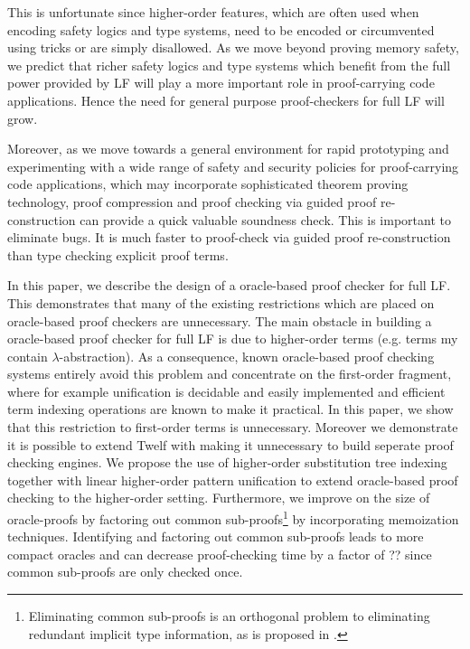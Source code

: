\documentclass{acmconf}
\begin{document}
This is
unfortunate since higher-order features, which are often used when
encoding safety logics and type systems, need to be encoded or
circumvented using tricks or are simply disallowed. As we move beyond
proving memory safety, we predict that richer safety logics and type
systems which benefit from the full power provided by LF will play a
more important role in proof-carrying code applications. Hence the
need for general purpose proof-checkers for full LF will grow.

Moreover, as we move towards a general environment for rapid
prototyping and experimenting with a wide range of safety and security
policies for proof-carrying code applications, which may incorporate
sophisticated theorem proving technology, proof compression and proof
checking via guided proof re-construction can provide a quick valuable
soundness check. This is important to eliminate bugs. It is much faster to
proof-check via guided proof re-construction than type checking
explicit proof terms.  

In this paper, we describe the design of a oracle-based proof checker for
full LF. This demonstrates that many of the existing restrictions
which are placed on oracle-based proof checkers are unnecessary. The
main obstacle in building a oracle-based proof checker for full LF
is due to higher-order terms (e.g. terms my contain
$\lambda$-abstraction). As a consequence, known oracle-based proof checking
systems entirely avoid this problem and concentrate on the first-order
fragment, where for example unification is decidable and easily
implemented and efficient term indexing operations are known to make
it practical. In this paper, we show that this restriction to
first-order terms is unnecessary. Moreover we demonstrate it is
possible to extend Twelf with making it unnecessary to build seperate
proof checking engines.
We propose the use of higher-order substitution tree indexing together
with linear higher-order pattern unification to extend oracle-based
proof checking to the higher-order setting. Furthermore, we improve on
the size of oracle-proofs by factoring out common
sub-proofs\footnote{Eliminating common sub-proofs is an orthogonal
  problem to eliminating redundant implicit type 
  information, as is   proposed in \cite{Necula98lics}.} by
incorporating memoization techniques. Identifying and factoring out
common sub-proofs leads to more compact oracles and can  
decrease proof-checking time by a factor of ?? since common sub-proofs
are only checked once.  
\end{document}
